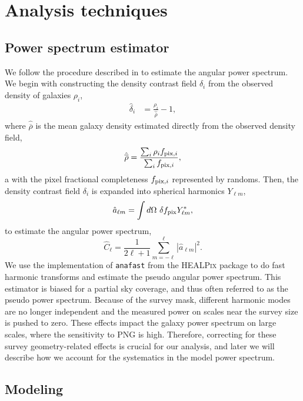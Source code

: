 \section{Analysis techniques}
\label{sec:method} 
 
\subsection{Power spectrum estimator}
We follow the procedure described in \cite{hivon2002master} to estimate the angular power spectrum. We begin with constructing the density contrast field $\delta_{i}$ from the observed density of galaxies $\rho_{i}$,
\begin{align}\label{eq:delta}
    \hat{\delta}_{i} &= \frac{\rho_{i}}{\hat{\overline{\rho}}} - 1,
\end{align}
where $\hat{\overline{\rho}}$ is the mean galaxy density estimated directly from the observed density field,
\begin{equation}\label{eq:nbar}
\hat{\overline{\rho}} = \frac{\sum_{i}\rho_{i}f_{{\rm pix},i}}{\sum_{i}f_{{\rm pix},i}},
\end{equation}a
with the pixel fractional completeness $f_{{\rm pix},i}$ represented by randoms. Then, the density contrast field $\delta_{i}$ is expanded into spherical harmonics $Y_{\ell m}$, 
\begin{equation}
        \hat{a}_{\ell m} = \int d\Omega ~ \delta f_{\rm pix} Y^{*}_{\ell m},
\end{equation}
to estimate the angular power spectrum,
\begin{equation}\label{eq:pusedocell}
        \hat{C}_{\ell} = \frac{1}{2\ell +1} \sum_{m=-\ell}^{\ell} |\hat{a}_{\ell m}|^{2}.
\end{equation}
We use the implementation of \texttt{anafast} from the \textsc{HEALPix} package \citep{gorski2005healpix} to do fast harmonic transforms and estimate the pseudo angular power spectrum. This estimator is biased for a partial sky coverage, and thus often referred to as the pseudo power spectrum. Because of the survey mask, different harmonic modes are no longer independent and the measured power on scales near the survey size is pushed to zero. These effects impact the galaxy power spectrum on large scales, where the sensitivity to PNG is high. Therefore, correcting for these survey geometry-related effects is crucial for our analysis, and later we will describe how we account for the systematics in the model power spectrum. 

 \subsection{Modeling}

